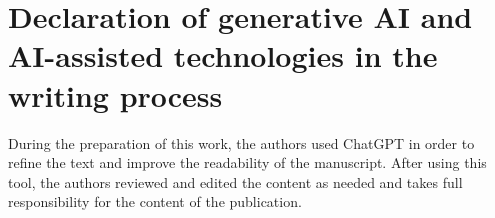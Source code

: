 \documentclass[preprint,12pt]{elsarticle}
\begin{document}


\section*{Declaration of generative AI and AI-assisted technologies in the writing process}
During the preparation of this work, the authors used ChatGPT in order to refine the text and improve the readability of the manuscript. After using this tool, the authors reviewed and edited the content as needed and takes full responsibility for the content of the publication.


\end{document}
